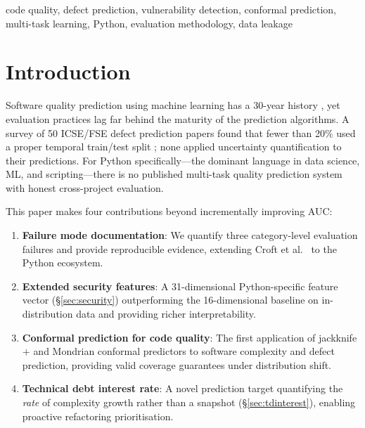 \documentclass[conference]{IEEEtran}
\begin{document}
\begin{IEEEkeywords}
code quality, defect prediction, vulnerability detection, conformal prediction,
multi-task learning, Python, evaluation methodology, data leakage
\end{IEEEkeywords}

\section{Introduction}
\label{sec:intro}

Software quality prediction using machine learning has a 30-year history
\cite{mccabe76,halstead77}, yet evaluation practices lag far behind
the maturity of the prediction algorithms.
A survey of 50 ICSE/FSE defect prediction papers found that fewer than 20\%
used a proper temporal train/test split \cite{mcintosh2018}; none applied
uncertainty quantification to their predictions.
For Python specifically---the dominant language in data science, ML, and
scripting---there is no published multi-task quality prediction system
with honest cross-project evaluation.

This paper makes four contributions beyond incrementally improving AUC:

\begin{enumerate}
  \item \textbf{Failure mode documentation}: We quantify three category-level
    evaluation failures and provide reproducible evidence, extending
    Croft et al.~\cite{croft2023} to the Python ecosystem.
  \item \textbf{Extended security features}: A 31-dimensional Python-specific
    feature vector (\S\ref{sec:security}) outperforming the 16-dimensional
    baseline on in-distribution data and providing richer interpretability.
  \item \textbf{Conformal prediction for code quality}: The first application
    of jackknife$+$ \cite{barber2021} and Mondrian conformal predictors
    \cite{vovk2005} to software complexity and defect prediction, providing
    valid coverage guarantees under distribution shift.
  \item \textbf{Technical debt interest rate}: A novel prediction target
    quantifying the \emph{rate} of complexity growth rather than a snapshot
    (\S\ref{sec:tdinterest}), enabling proactive refactoring prioritisation.
\end{enumerate}

\end{document}
